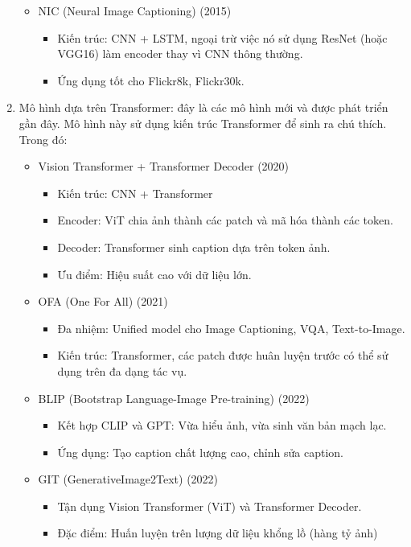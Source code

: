 \documentclass[../main.tex]{subfiles}
\begin{document}
\begin{enumerate}
\begin{itemize}
        \item NIC (Neural Image Captioning) (2015)
        \begin{itemize}
            \item Kiến trúc: CNN + LSTM, ngoại trừ việc nó sử dụng ResNet (hoặc VGG16) làm encoder thay vì CNN thông thường.
            \item Ứng dụng tốt cho Flickr8k, Flickr30k.
        \end{itemize}
    \end{itemize}
    \item Mô hình dựa trên Transformer: đây là các mô hình mới và được phát triển gần đây. Mô hình này sử dụng kiến trúc Transformer để sinh ra chú thích. Trong đó:
        \begin{itemize}
            \item Vision Transformer + Transformer Decoder (2020)
            \begin{itemize}
                \item Kiến trúc: CNN + Transformer
                \item Encoder: ViT chia ảnh thành các patch và mã hóa thành các token.
                \item Decoder: Transformer sinh caption dựa trên token ảnh.
                \item Ưu điểm: Hiệu suất cao với dữ liệu lớn.
            \end{itemize}
            \item OFA (One For All) (2021)
            \begin{itemize}
                \item Đa nhiệm: Unified model cho Image Captioning, VQA, Text-to-Image.
                \item Kiến trúc: Transformer, các patch được huân luyện trước có thể sử dụng trên đa dạng tác vụ.
            \end{itemize}
            \item BLIP (Bootstrap Language-Image Pre-training) (2022)
            \begin{itemize}
                \item Kết hợp CLIP và GPT: Vừa hiểu ảnh, vừa sinh văn bản mạch lạc.
                \item Ứng dụng: Tạo caption chất lượng cao, chỉnh sửa caption.
            \end{itemize}
            \item GIT (GenerativeImage2Text) (2022)
            \begin{itemize}
                \item Tận dụng Vision Transformer (ViT) và Transformer Decoder.
                \item Đặc điểm: Huấn luyện trên lượng dữ liệu khổng lồ (hàng tỷ ảnh)
            \end{itemize}
            \end{itemize}
\end{enumerate}
\end{document}
